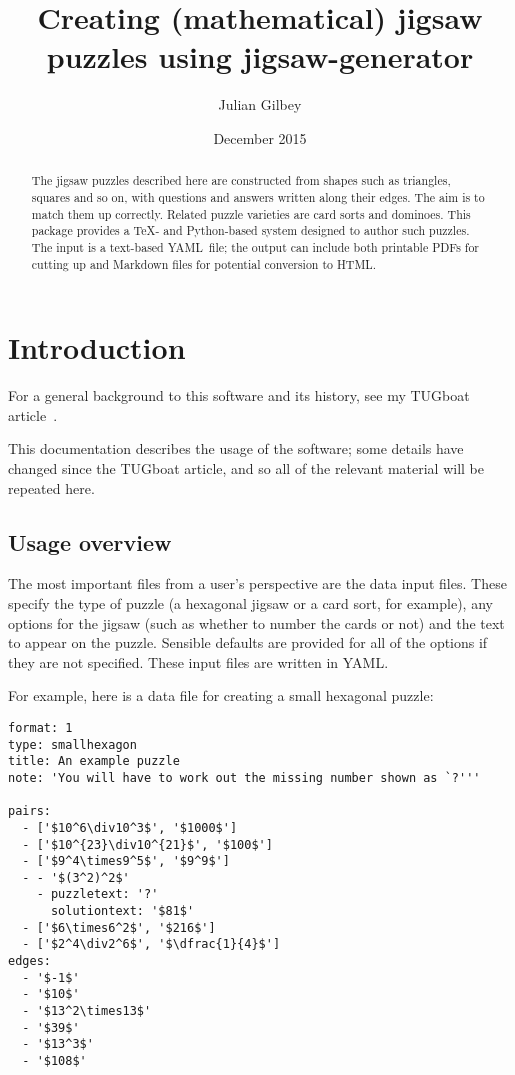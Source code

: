 \documentclass{article}
\def\YAML{{\small YAML}}
\def\PDF{{\small PDF}}
\def\HTML{{\small HTML}}
\def\TUG{{\small TUG}}
\begin{document}
\title{Creating (mathematical) jigsaw puzzles using jigsaw-generator}
\author{Julian Gilbey}
\date{December 2015}
\maketitle

\begin{abstract}
  \noindent
  The jigsaw puzzles described here are constructed from shapes such
  as triangles, squares and so on, with questions and answers written
  along their edges.  The aim is to match them up correctly.  Related
  puzzle varieties are card sorts and dominoes.  This package provides
  a \TeX- and Python-based system designed to author such puzzles.
  The input is a text-based \YAML\ file; the output can include both
  printable \PDF s for cutting up and Markdown files for potential
  conversion to \HTML.
\end{abstract}

\tableofcontents

\section{Introduction}

For a general background to this software and its history, see
my \TUG boat article~\cite{JGtugboat}.

This documentation describes the usage of the software; some details
have changed since the \TUG boat article, and so all of the relevant
material will be repeated here.

\subsection{Usage overview}

The most important files from a user's perspective are the data input
files.  These specify the type of puzzle (a hexagonal jigsaw or a card
sort, for example), any options for the jigsaw (such as whether to
number the cards or not) and the text to appear on the puzzle.
Sensible defaults are provided for all of the options if they are not
specified.  These input files are written in \YAML.

For example, here is a data file for creating a small hexagonal puzzle:

\begin{verbatim}
format: 1
type: smallhexagon
title: An example puzzle
note: 'You will have to work out the missing number shown as `?'''

pairs:
  - ['$10^6\div10^3$', '$1000$']
  - ['$10^{23}\div10^{21}$', '$100$']
  - ['$9^4\times9^5$', '$9^9$']
  - - '$(3^2)^2$'
    - puzzletext: '?'
      solutiontext: '$81$'
  - ['$6\times6^2$', '$216$']
  - ['$2^4\div2^6$', '$\dfrac{1}{4}$']
edges:
  - '$-1$'
  - '$10$'
  - '$13^2\times13$'
  - '$39$'
  - '$13^3$'
  - '$108$'
\end{verbatim}
\end{document}
